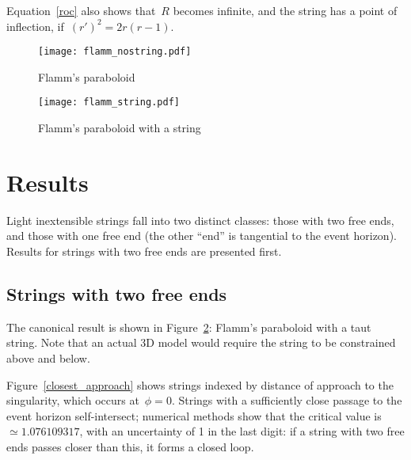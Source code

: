 \documentclass[prb,preprint]{revtex4-1}
\begin{document}
% 
% 
% 

Equation~\ref{roc} also shows that~$R$ becomes infinite, and the
string has a point of inflection,
if~$\left(r'\right)^2=2r\left(r-1\right)$.

\begin{figure}[h!]
\centering
\texttt{[image: flamm\_nostring.pdf]}
\caption{Flamm's paraboloid}
\label{flamm_nostring}
\end{figure}

\begin{figure}[h!]
\centering
\texttt{[image: flamm\_string.pdf]}
\caption{Flamm's paraboloid with a string}
\label{flamm_withstring}
\end{figure}

\section{Results}
Light inextensible strings fall into two distinct classes: those with
two free ends, and those with one free end (the other ``end'' is
tangential to the event horizon).  Results for strings with two free
ends are presented first.


\subsection{Strings with two free ends}

The canonical result is shown in Figure~\ref{flamm_withstring}:
Flamm's paraboloid with a taut string.  Note that an actual 3D model
would require the string to be constrained above and below.

Figure~\ref{closest_approach} shows strings indexed by distance of
approach to the singularity, which occurs at~$\phi=0$.  Strings with a
sufficiently close passage to the event horizon self-intersect;
numerical methods show that the critical value is~$\simeq
1.076109317$, with an uncertainty of 1 in the last digit: if a string
with two free ends passes closer than this, it forms a closed loop.
\end{document}
